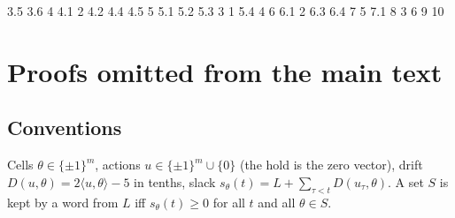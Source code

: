 \documentclass[11pt,a4paper]{article}
\theoremstyle{plain}
\theoremstyle{definition}
\theoremstyle{remark}
\begin{document}
\expandafter\def\csname mainlab@cor:kleitman\endcsname{3.5}
\expandafter\def\csname mainlab@prop:incomparable\endcsname{3.6}
\expandafter\def\csname mainlab@sec:thresholds\endcsname{4}
\expandafter\def\csname mainlab@def:game\endcsname{4.1}
\expandafter\def\csname mainlab@tab:game\endcsname{2}
\expandafter\def\csname mainlab@prop:game\endcsname{4.2}
\expandafter\def\csname mainlab@prop:firststep\endcsname{4.4}
\expandafter\def\csname mainlab@prop:pinned\endcsname{4.5}
\expandafter\def\csname mainlab@sec:classification\endcsname{5}
\expandafter\def\csname mainlab@thm:m4\endcsname{5.1}
\expandafter\def\csname mainlab@thm:m5\endcsname{5.2}
\expandafter\def\csname mainlab@thm:m6\endcsname{5.3}
\expandafter\def\csname mainlab@tab:census\endcsname{3}
\expandafter\def\csname mainlab@fig:census\endcsname{1}
\expandafter\def\csname mainlab@cor:uniform\endcsname{5.4}
\expandafter\def\csname mainlab@tab:ladder\endcsname{4}
\expandafter\def\csname mainlab@sec:observation\endcsname{6}
\expandafter\def\csname mainlab@prop:antichain\endcsname{6.1}
\expandafter\def\csname mainlab@fig:horizon\endcsname{2}
\expandafter\def\csname mainlab@prop:feedback\endcsname{6.3}
\expandafter\def\csname mainlab@prop:deadline\endcsname{6.4}
\expandafter\def\csname mainlab@sec:pbvi\endcsname{7}
\expandafter\def\csname mainlab@tab:alpha\endcsname{5}
\expandafter\def\csname mainlab@prop:pbvi\endcsname{7.1}
\expandafter\def\csname mainlab@sec:float\endcsname{8}
\expandafter\def\csname mainlab@fig:knife\endcsname{3}
\expandafter\def\csname mainlab@tab:runtime\endcsname{6}
\expandafter\def\csname mainlab@sec:verification\endcsname{9}
\expandafter\def\csname mainlab@sec:related\endcsname{10}
\section{Proofs omitted from the main text}\label{S:proofs}

\subsection{Conventions}
Cells $\theta\in\{\pm1\}^m$, actions $u\in\{\pm1\}^m\cup\{0\}$ (the hold is the zero vector), drift $D(u,\theta)=2\langle u,\theta\rangle-5$ in tenths, slack $s_\theta(t)=L+\sum_{\tau<t}D(u_\tau,\theta)$. A set $S$ is kept by a word from $L$ iff $s_\theta(t)\ge0$ for all $t$ and all $\theta\in S$.
\end{document}
